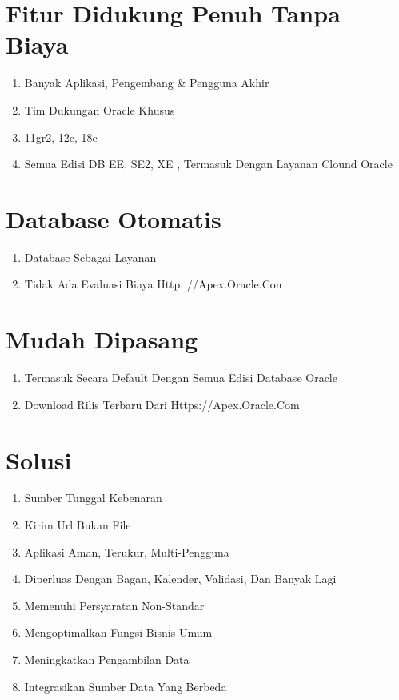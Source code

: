 \documentclass{article}
\begin{document}
\section{Fitur Didukung Penuh Tanpa Biaya}
    \begin{enumerate}
    \item Banyak Aplikasi, Pengembang & Pengguna Akhir
    \item Tim Dukungan Oracle Khusus
    \item 11gr2, 12c, 18c
    \item Semua Edisi DB EE, SE2, XE , Termasuk Dengan Layanan Clound Oracle

    \end{enumerate}

\section {Database Otomatis}
    \begin{enumerate}
        \item Database Sebagai Layanan
        \item Tidak Ada Evaluasi Biaya Http: //Apex.Oracle.Con

    \end{enumerate}
\section{Mudah Dipasang}
\begin{enumerate}
    \item Termasuk Secara Default Dengan Semua Edisi Database Oracle
\item Download Rilis Terbaru Dari Https://Apex.Oracle.Com

\end{enumerate}
\section{Solusi}
\begin{enumerate}
    \item Sumber Tunggal Kebenaran
\item Kirim Url Bukan File
\item Aplikasi Aman, Terukur, Multi-Pengguna
\item Diperluas Dengan Bagan, Kalender, Validasi, Dan Banyak Lagi
\item  Memenuhi Persyaratan Non-Standar
\item Mengoptimalkan Fungsi Bisnis Umum
\item  Meningkatkan Pengambilan Data
\item Integrasikan Sumber Data Yang Berbeda


\end{enumerate}
\end{document}
